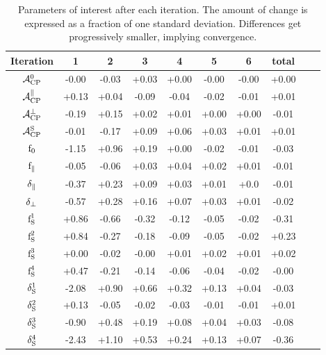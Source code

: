 \begin{table}[t]
\centering
\footnotesize
\begin{tabular}{ c c c c c c c c c | c}
  \hline
  Iteration          &       1       &       2       &       3       &       4       &       5       &       6  & total\\
  \hline
  $\mathcal{A}_{\rm CP}^{0}$                       &  -0.00  &  -0.03  &  +0.03  &  +0.00  &  -0.00  &  -0.00  &  +0.00    \\
  $\mathcal{A}_{\rm CP}^{\parallel}$               &  +0.13  &  +0.04  &  -0.09  &  -0.04  &  -0.02  &  -0.01  &  +0.01    \\
  $\mathcal{A}_{\rm CP}^{\perp}$                   &  -0.19  &  +0.15  &  +0.02  &  +0.01  &  +0.00  &  +0.00  &  -0.01    \\
  $\mathcal{A}_{\rm CP}^{\text{S}}$                &  -0.01  &  -0.17  &  +0.09  &  +0.06  &  +0.03  &  +0.01  &  +0.01    \\
  \hline
  $\text{f}_{0}$                        &  -1.15  &  +0.96  &  +0.19  &  +0.00  &  -0.02  &  -0.01  &  -0.03    \\
  $\text{f}_{\parallel}$                &  -0.05  &  -0.06  &  +0.03  &  +0.04  &  +0.02  &  +0.01  &  -0.01    \\
  $\delta_{\parallel}$          &  -0.37  &  +0.23  &  +0.09  &  +0.03  &  +0.01  &  +0.0   &  -0.01    \\
  $\delta_{\perp}$              &  -0.57  &  +0.28  &  +0.16  &  +0.07  &  +0.03  &  +0.01  &  -0.02    \\
  \hline
  $\text{f}_{\text{S}}^{1}$                        &  +0.86  &  -0.66  &  -0.32  &  -0.12  &  -0.05  &  -0.02  &  -0.31    \\
  $\text{f}_{\text{S}}^{2}$                        &  +0.84  &  -0.27  &  -0.18  &  -0.09  &  -0.05  &  -0.02  &  +0.23    \\
  $\text{f}_{\text{S}}^{3}$                        &  +0.00  &  -0.02  &  -0.00  &  +0.01  &  +0.02  &  +0.01  &  +0.02    \\
  $\text{f}_{\text{S}}^{4}$                        &  +0.47  &  -0.21  &  -0.14  &  -0.06  &  -0.04  &  -0.02  &  -0.00   \\
  $\delta_{\text{S}}^{1}$                    &  -2.08  &  +0.90  &  +0.66  &  +0.32  &  +0.13  &  +0.04  &  -0.03    \\
  $\delta_{\text{S}}^{2}$                    &  +0.13  &  -0.05  &  -0.02  &  -0.03  &  -0.01  &  -0.01  &  +0.01    \\
  $\delta_{\text{S}}^{3}$                    &  -0.90  &  +0.48  &  +0.19  &  +0.08  &  +0.04  &  +0.03  &  -0.08    \\
  $\delta_{\text{S}}^{4}$                    &  -2.43  &  +1.10  &  +0.53  &  +0.24  &  +0.13  &  +0.07  &  -0.36    \\
  \hline
\end{tabular}
\caption{Parameters of interest after each iteration. The amount of change is expressed as a fraction of one standard deviation.
         Differences get progressively smaller, implying convergence.}
\label{pars_convergence}
\end{table}

